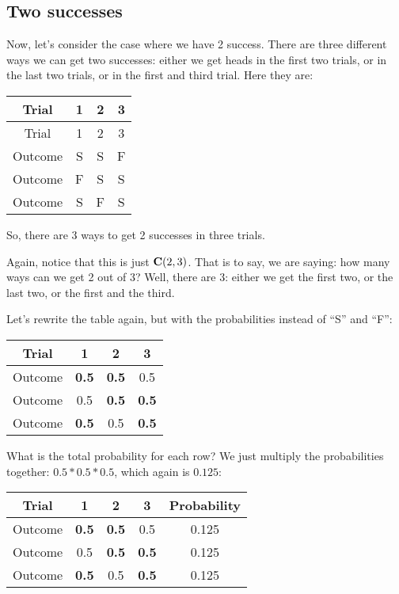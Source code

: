 \documentclass[../../../main.tex]{subfiles}
\begin{document}
\subsection{Two successes}

Now, let's consider the case where we have 2 success. There are three different ways we can get two successes: either we get heads in the first two trials, or in the last two trials, or in the first and third trial. Here they are:

\begin{center}
  \begin{tabular}{| c | c | c | c |}
    \hline
      \textbf{Trial} & \textbf{1} & \textbf{2} & \textbf{3} \\ \hline
    Trial & 1 & 2 & 3 \\ \hline
  Outcome & S & S & F \\ \hline
  Outcome & F & S & S \\ \hline
  Outcome & S & F & S \\ \hline
  \end{tabular}
\end{center}

\noindent
So, there are 3 ways to get 2 successes in three trials.

Again, notice that this is just $\mathbf{C}(2, 3)$. That is to say, we are saying: how many ways can we get 2 out of 3? Well, there are 3: either we get the first two, or the last two, or the first and the third.

Let's rewrite the table again, but with the probabilities instead of ``S'' and ``F'':

\begin{center}
  \begin{tabular}{| c | c | c | c |}
    \hline
      \textbf{Trial} & \textbf{1} & \textbf{2} & \textbf{3} \\ \hline
  Outcome & \textbf{0.5} & \textbf{0.5} & 0.5 \\ \hline
  Outcome & 0.5 & \textbf{0.5} & \textbf{0.5} \\ \hline
  Outcome & \textbf{0.5} & 0.5 & \textbf{0.5} \\ \hline
  \end{tabular}
\end{center}

\noindent
What is the total probability for each row? We just multiply the probabilities together: $0.5 * 0.5 * 0.5$, which again is $0.125$:

\begin{center}
  \begin{tabular}{| c | c | c | c | c |}
    \hline
      \textbf{Trial} & \textbf{1} & \textbf{2} & \textbf{3} & \textbf{Probability} \\ \hline
  Outcome & \textbf{0.5} & \textbf{0.5} & 0.5 & 0.125  \\ \hline
  Outcome & 0.5 & \textbf{0.5} & \textbf{0.5} & 0.125 \\ \hline
  Outcome & \textbf{0.5} & 0.5 & \textbf{0.5} & 0.125 \\ \hline
  \end{tabular}
\end{center}
\end{document}
